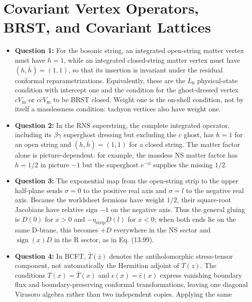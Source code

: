 \documentclass[
  10pt,
  a4paper,
  openany]{book}
\providecommand{\tightlist}{%
  \setlength{\itemsep}{0pt}\setlength{\parskip}{0pt}}
\begin{document}
\section{Covariant Vertex Operators, BRST, and Covariant
Lattices}\label{covariant-vertex-operators-brst-and-covariant-lattices}

\begin{itemize}
\tightlist
\item
  \textbf{Question 1:} For the bosonic string, an integrated open-string
  matter vertex must have \(h=1\), while an integrated closed-string
  matter vertex must have \((h,\bar h)=(1,1)\), so that its insertion is
  invariant under the residual conformal reparametrizations.
  Equivalently, these are the \(L_0\) physical-state condition with
  intercept one and the condition for the ghost-dressed vertex
  \(cV_{\mathrm m}\) or \(c\bar cV_{\mathrm m}\) to be BRST closed.
  Weight one is the on-shell condition, not by itself a masslessness
  condition: tachyon vertices also have weight one.
\item
  \textbf{Question 2:} In the RNS superstring, the complete integrated
  operator, including its \(\beta\gamma\) superghost dressing but
  excluding the \(c\) ghost, has \(h=1\) for an open string and
  \((h,\bar h)=(1,1)\) for a closed string. The matter factor alone is
  picture-dependent: for example, the massless NS matter factor has
  \(h=1/2\) in picture \(-1\) but the superghost \(e^{-\phi}\) supplies
  the missing \(1/2\).
\item
  \textbf{Question 3:} The exponential map from the open-string strip to
  the upper half-plane sends \(\sigma=0\) to the positive real axis and
  \(\sigma=l\) to the negative real axis. Because the worldsheet
  fermions have weight \(1/2\), their square-root Jacobians have
  relative sign \(-1\) on the negative axis. Thus the general gluing is
  \(D(0)\) for \(x>0\) and \(-\eta_{\mathrm{strip}}D(l)\) for \(x<0\);
  when both ends lie on the same D-brane, this becomes \(+D\) everywhere
  in the NS sector and \(\operatorname{sign}(x)D\) in the R sector, as
  in Eq. (13.99).
\item
  \textbf{Question 4:} In BCFT, \(\bar T(\bar z)\) denotes the
  antiholomorphic stress-tensor component, not automatically the
  Hermitian adjoint of \(T(z)\). The conditions \(T(x)=\bar T(x)\) and
  \(\epsilon(x)=\bar\epsilon(x)\) express vanishing boundary flux and
  boundary-preserving conformal transformations, leaving one diagonal
  Virasoro algebra rather than two independent copies. Applying the same

\end{itemize}
\end{document}
